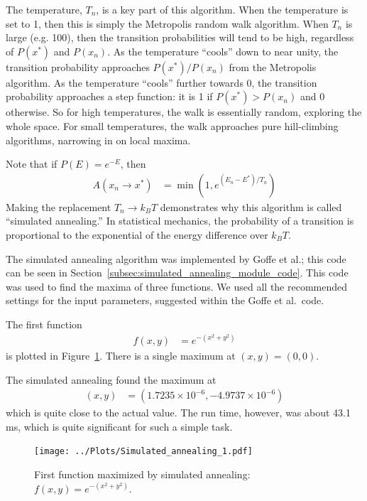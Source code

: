 \documentclass[twocolumn]{myarticle}
\begin{document}
The temperature, $ T_n $, is a key part of this algorithm.
When the temperature is set to 1, then this is simply the Metropolis random walk algorithm.
When $ T_n $ is large (e.g. 100), then the transition probabilities will tend to be high, regardless of $ P(x^*) $ and $ P(x_n) $.
As the temperature ``cools'' down to near unity, the transition probability approaches $ P(x^*)/P(x_n) $ from the Metropolis algorithm.
As the temperature ``cools'' further towards 0, the transition probability approaches a step function: it is 1 if $ P(x^*) > P(x_n) $ and $ 0 $ otherwise.
So for high temperatures, the walk is essentially random, exploring the whole space.
For small temperatures, the walk approaches pure hill-climbing algorithms, narrowing in on local maxima.

Note that if $ P(E) = e^{-E} $, then
\begin{align}
    A\left(x_n \to x^*\right) &= \min \left( 1, e^{(E_n - E^*)/T_n} \right)
\end{align}
Making the replacement $ T_n \to k_B T $ demonstrates why this algorithm is called ``simulated annealing.''
In statistical mechanics, the probability of a transition is proportional to the exponential of the energy difference over $ k_B T $.

The simulated annealing algorithm was implemented by Goffe et al.; this code can be seen in Section~\ref{subsec:simulated_annealing_module_code}.
This code was used to find the maxima of three functions.
We used all the recommended settings for the input parameters, suggested within the Goffe et al.\ code.

The first function
\begin{align}
    f(x,y) &= e^{-\left(x^2 + y^2\right)}
\end{align}
is plotted in Figure~\ref{fig:simulated_annealing_1}.
There is a single maximum at $ (x,y) = (0,0) $.

The simulated annealing found the maximum at
\begin{align}
    (x,y) &= \left( 1.7235 \times 10^{-6}, -4.9737 \times 10^{-6} \right)
\end{align}
which is quite close to the actual value.
The run time, however, was about 43.1 ms, which is quite significant for such a simple task.


\begin{figure}[ht!]
    \begin{center}
    \texttt{[image: ../Plots/Simulated\_annealing\_1.pdf]}
    \caption{%
    First function maximized by simulated annealing: $ f(x,y) = e^{-\left(x^2 + y^2\right)} $.
    }
    \label{fig:simulated_annealing_1}
    \end{center}
\end{figure}
\end{document}
